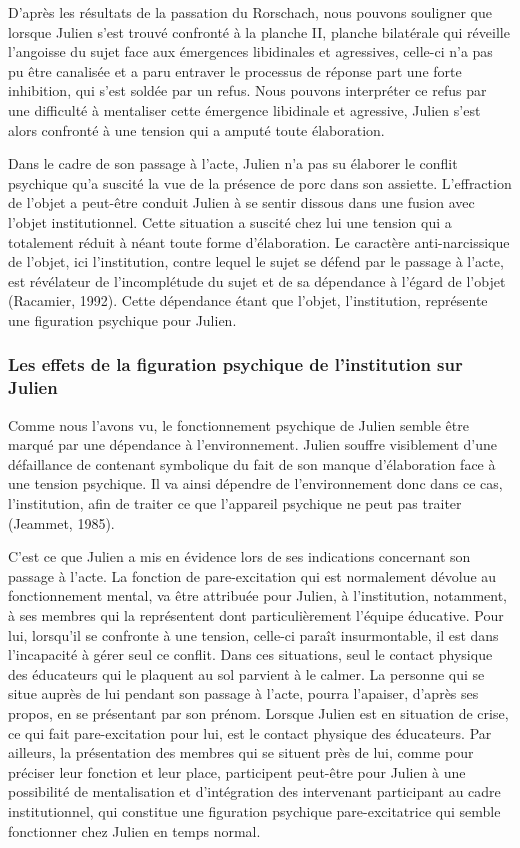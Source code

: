 \documentclass[12pt, a4paper]{book}
\begin{document}
\begin{spacing}{1.5}
D'après les résultats de la passation du Rorschach, nous pouvons souligner que lorsque Julien s'est trouvé confronté à la planche II, planche bilatérale qui réveille l'angoisse du sujet face aux émergences libidinales et agressives, celle-ci n'a pas pu être canalisée et a paru entraver le processus de réponse part une forte inhibition, qui s'est soldée par un refus. Nous pouvons interpréter ce refus par une difficulté à mentaliser cette émergence libidinale et agressive, Julien s'est alors confronté à une tension qui a amputé toute élaboration.

Dans le cadre de son passage à l'acte, Julien n'a pas su élaborer le conflit psychique qu'a suscité la vue de la présence de porc dans son assiette. L'effraction de l'objet a peut-être conduit Julien à se sentir dissous dans une fusion avec l'objet institutionnel. Cette situation a suscité chez lui une tension qui a totalement réduit à néant toute forme d'élaboration. Le caractère anti-narcissique de l'objet, ici l'institution, contre lequel le sujet se défend par le passage à l'acte, est révélateur de l'incomplétude du sujet et de sa dépendance à l'égard de l'objet (Racamier, 1992). Cette dépendance étant que l'objet, l'institution, représente une figuration psychique pour Julien.

\subsubsection{Les effets de la figuration psychique de l'institution sur Julien}

Comme nous l'avons vu, le fonctionnement psychique de Julien semble être marqué par une dépendance à l'environnement. Julien souffre visiblement d'une défaillance de contenant symbolique du fait de son manque d'élaboration face à une tension psychique. Il va ainsi dépendre de l'environnement donc dans ce cas, l'institution, afin de traiter ce que l'appareil psychique ne peut pas traiter (Jeammet, 1985). 

C'est ce que Julien a mis en évidence lors de ses indications concernant son passage à l'acte. La fonction de pare-excitation qui est normalement dévolue au fonctionnement mental, va être attribuée pour Julien, à l'institution, notamment, à ses membres qui la représentent dont particulièrement l'équipe éducative. Pour lui, lorsqu'il se confronte à une tension, celle-ci paraît insurmontable, il est dans l'incapacité à gérer seul ce conflit. Dans ces situations, seul le contact physique des éducateurs qui le plaquent au sol parvient à le calmer. La personne qui se situe auprès de lui pendant son passage à l'acte, pourra l'apaiser, d'après ses propos, en se présentant par son prénom. Lorsque Julien est en situation de crise, ce qui fait pare-excitation pour lui, est le contact physique des éducateurs. Par ailleurs, la présentation des membres qui se situent près de lui, comme pour préciser leur fonction et leur place, participent peut-être pour Julien à une possibilité de mentalisation et d'intégration des intervenant participant au cadre institutionnel, qui constitue une figuration psychique pare-excitatrice qui semble fonctionner chez Julien en temps normal.


\end{spacing}
\end{document}

